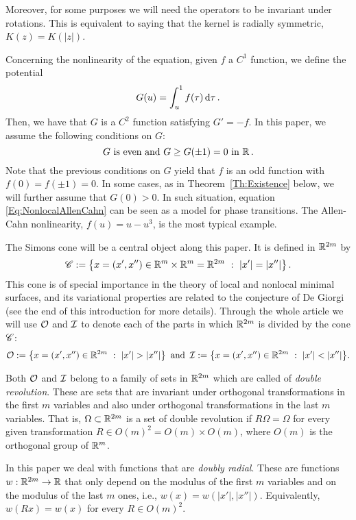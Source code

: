 Moreover, for some purposes we will need the operators to be invariant under rotations. This is equivalent to saying that the kernel is radially symmetric, $K(z) = K(|z|)$. 

Concerning the nonlinearity of the equation, given $f$ a $C^1$ function, we define the potential
$$
G(u)= \int_u^1 f(\tau) \,\mathrm{d} \tau\,.
$$
Then, we have that $G$ is a $C^2$ function satisfying $G' = -f$. In this paper, we assume the following conditions on $G$:
\begin{equation}
\label{Eq:HipothesesG}
G \textrm{ is even and } G\geq G(\pm 1 )=0 \textrm{ in } \mathbb{R}\,.
\end{equation}
Note that the previous conditions on $G$ yield that $f$ is an odd function with $f(0)=f(\pm 1)=0$. In some cases, as in Theorem~\ref{Th:Existence} below, we will further assume that $G(0)>0$. In such situation, equation \eqref{Eq:NonlocalAllenCahn} can be seen as a model for phase transitions. The Allen-Cahn nonlinearity, $f(u) = u-u^3$, is the most typical example.


The Simons cone will be a central object along this paper. It is defined in $\mathbb{R}^{2m}$ by
\begin{equation}
\label{Eq:SimonsCone}
\mathscr{C} := \left \{ x = (x', x'') \in \mathbb{R}^m \times \mathbb{R}^m=\mathbb{R}^{2m} \ : \ |x'| = |x''| \right \}.
\end{equation}
This cone is of special importance in the theory of local and nonlocal minimal surfaces, and its variational properties are related to the conjecture of De Giorgi (see the end of this introduction for more details). Through the whole article we will use $\mathcal{O}$ and $\mathcal{I}$ to denote each of the parts in which $\mathbb{R}^{2m}$ is divided by the cone $\mathscr{C}$:
$$
\mathcal{O}:= \left \{ x = (x', x'') \in \mathbb{R}^{2m} \ : \ |x'| > |x''| \right \} \textrm{ and } \,
\mathcal{I}:= \left \{ x = (x', x'') \in \mathbb{R}^{2m} \ : \ |x'| < |x''| \right \}\!.
$$

Both $\mathcal{O}$ and $\mathcal{I}$ belong to a family of sets in $\mathbb{R}^{2m}$ which are called of \emph{double revolution}. These are sets that are invariant under orthogonal transformations in the first $m$ variables and also under orthogonal transformations in the last $m$ variables. That is, $\Omega\subset \mathbb{R}^{2m}$ is a set of double revolution if $R\Omega = \Omega$ for every given transformation $R\in O(m)^2 = O(m) \times O(m)$, where  $O(m)$ is the orthogonal group of $\mathbb{R}^m$.

In this paper we deal with functions that are \emph{doubly radial}. These are functions $w:\mathbb{R}^{2m}  \to \mathbb{R}$ that only depend on the modulus of the first $m$ variables and on the modulus of the last $m$ ones, i.e., $w(x) = w(|x'|,|x''|)$. Equivalently, $w(Rx) = w(x)$ for every $R \in O(m)^2$.

